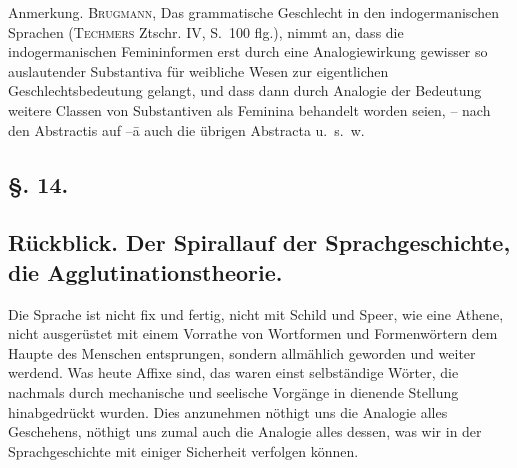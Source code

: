 {\begin{styleAnmerk}
Anmerkung. \textsc{Brugmann}, Das grammatische Geschlecht in den indogermanischen Sprachen (\textsc{Techmers} Ztschr. IV, S.~100 flg.), nimmt an, dass die indogermanischen Femininformen erst durch eine Analogiewirkung gewisser so auslautender Substantiva für weibliche Wesen zur eigentlichen Geschlechtsbedeutung gelangt, und dass dann durch Analogie der Bedeutung weitere Classen von Substantiven als Feminina behandelt worden seien, – nach den Abstractis auf –ā auch die übrigen Abstracta u.~s.~w.
\end{styleAnmerk}

\label{fp.250}

\subsection*{§. 14.}\label{III.II.II.14}
\subsection*{Rückblick. Der Spirallauf der Sprachgeschichte, die Agglutinationstheorie.}
Die Sprache ist nicht fix und fertig, nicht mit Schild und Speer, wie eine Athene, nicht ausgerüstet mit einem Vorrathe von Wortformen und Formenwörtern dem Haupte des Menschen entsprungen, sondern allmählich geworden und weiter werdend. Was heute Affixe sind, das waren einst selbständige Wörter, die nachmals durch mechanische und seelische Vorgänge in dienende Stellung hinabgedrückt wurden. Dies anzunehmen nöthigt uns die Analogie alles Geschehens, nöthigt uns zumal auch die Analogie alles dessen, was wir in der Sprachgeschichte mit einiger Sicherheit verfolgen können.

}
